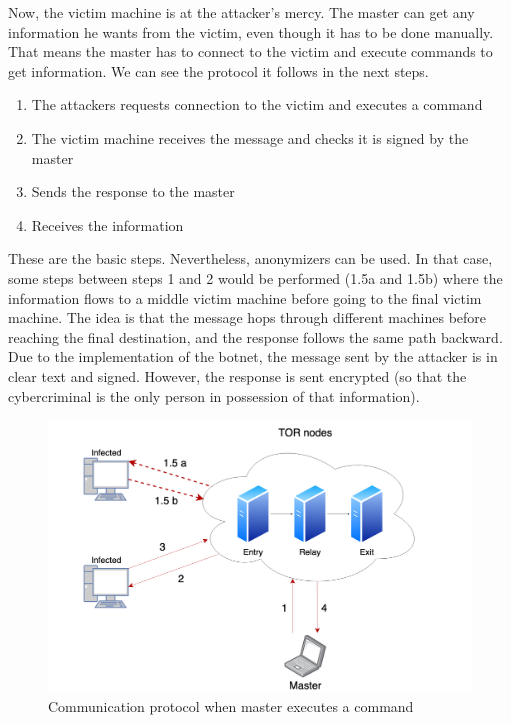 \documentclass[11pt, a4paper,twoside]{tesi_upf}
\begin{document}
Now, the victim machine is at the attacker's mercy. The master can get any information he wants from the victim, even though it has to be done manually. That means the master has to connect to the victim and execute commands to get information. We can see the protocol it follows in the next steps.

\begin{enumerate}
    \item The attackers requests connection to the victim and executes a command
    \item The victim machine receives the message and checks it is signed by the master
    \item Sends the response to the master
    \item Receives the information
\end{enumerate}

These are the basic steps. Nevertheless, anonymizers can be used. In that case, some steps between steps 1 and 2 would be performed (1.5a and 1.5b) where the information flows to a middle victim machine before going to the final victim machine. The idea is that the message hops through different machines before reaching the final destination, and the response follows the same path backward. Due to the implementation of the botnet, the message sent by the attacker is in clear text and signed. However, the response is sent encrypted (so that the cybercriminal is the only person in possession of that information).

\begin{figure}[H]
    \centering
    \includegraphics[width=\linewidth]{images/zoom-connection.png}
    \caption{Communication protocol when master executes a command}
    \label{fig:botnet-architecture}
\end{figure}
\end{document}
